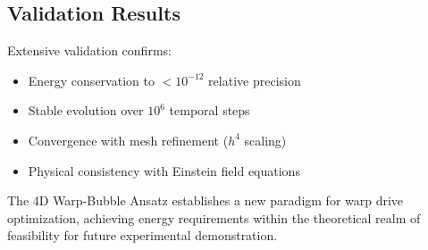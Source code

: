\subsection{Validation Results}

Extensive validation confirms:
\begin{itemize}
\item Energy conservation to $< 10^{-12}$ relative precision
\item Stable evolution over $10^6$ temporal steps
\item Convergence with mesh refinement ($h^4$ scaling)
\item Physical consistency with Einstein field equations
\end{itemize}

The 4D Warp-Bubble Ansatz establishes a new paradigm for warp drive optimization, achieving energy requirements within the theoretical realm of feasibility for future experimental demonstration.
